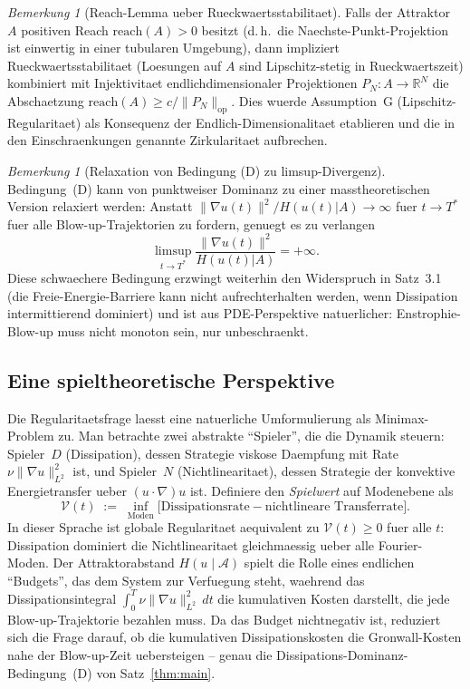 \documentclass[12pt,a4paper]{article}
\theoremstyle{definition}
\theoremstyle{plain}
\theoremstyle{remark}
\newtheorem{remark}[definition]{Bemerkung}
\begin{document}
\begin{remark}[Reach-Lemma ueber Rueckwaertsstabilitaet]
\label{rem:reach-lemma}
Falls der Attraktor $A$ positiven Reach $\mathrm{reach}(A) > 0$ besitzt (d.\,h.\ die Naechste-Punkt-Projektion ist einwertig in einer tubularen Umgebung), dann impliziert Rueckwaertsstabilitaet (Loesungen auf $A$ sind Lipschitz-stetig in Rueckwaertszeit) kombiniert mit Injektivitaet endlichdimensionaler Projektionen $P_N: A \to \mathbb{R}^N$ die Abschaetzung $\mathrm{reach}(A) \geq c/\|P_N\|_{\mathrm{op}}$. Dies wuerde Assumption~G (Lipschitz-Regularitaet) als Konsequenz der Endlich-Dimensionalitaet etablieren und die in den Einschraenkungen genannte Zirkularitaet aufbrechen.
\end{remark}

\begin{remark}[Relaxation von Bedingung (D) zu limsup-Divergenz]
\label{rem:condition-d-limsup}
Bedingung~(D) kann von punktweiser Dominanz zu einer masstheoretischen Version relaxiert werden: Anstatt $\|\nabla u(t)\|^2 / H(u(t)|A) \to \infty$ fuer $t \to T^*$ fuer alle Blow-up-Trajektorien zu fordern, genuegt es zu verlangen
\[
\limsup_{t \to T^*} \frac{\|\nabla u(t)\|^2}{H(u(t)|A)} = +\infty.
\]
Diese schwaechere Bedingung erzwingt weiterhin den Widerspruch in Satz~3.1 (die Freie-Energie-Barriere kann nicht aufrechterhalten werden, wenn Dissipation intermittierend dominiert) und ist aus PDE-Perspektive natuerlicher: Enstrophie-Blow-up muss nicht monoton sein, nur unbeschraenkt.
\end{remark}

\subsection{Eine spieltheoretische Perspektive}

Die Regularitaetsfrage laesst eine natuerliche Umformulierung als Minimax-Problem zu. Man betrachte zwei abstrakte ``Spieler'', die die Dynamik steuern: Spieler~$D$ (Dissipation), dessen Strategie viskose Daempfung mit Rate $\nu\|\nabla u\|_{L^2}^2$ ist, und Spieler~$N$ (Nichtlinearitaet), dessen Strategie der konvektive Energietransfer ueber $(u\cdot\nabla)u$ ist. Definiere den \emph{Spielwert} auf Modenebene als
\begin{equation}
    \mathcal{V}(t) \;:=\; \inf_{\text{Moden}} \bigl[\text{Dissipationsrate} - \text{nichtlineare Transferrate}\bigr].
\end{equation}
In dieser Sprache ist globale Regularitaet aequivalent zu $\mathcal{V}(t) \ge 0$ fuer alle $t$: Dissipation dominiert die Nichtlinearitaet gleichmaessig ueber alle Fourier-Moden. Der Attraktorabstand $H(u\mid\mathcal{A})$ spielt die Rolle eines endlichen ``Budgets'', das dem System zur Verfuegung steht, waehrend das Dissipationsintegral $\int_0^T \nu\|\nabla u\|_{L^2}^2\,dt$ die kumulativen Kosten darstellt, die jede Blow-up-Trajektorie bezahlen muss. Da das Budget nichtnegativ ist, reduziert sich die Frage darauf, ob die kumulativen Dissipationskosten die Gronwall-Kosten nahe der Blow-up-Zeit uebersteigen -- genau die Dissipations-Dominanz-Bedingung~(D) von Satz~\ref{thm:main}.
\end{document}
